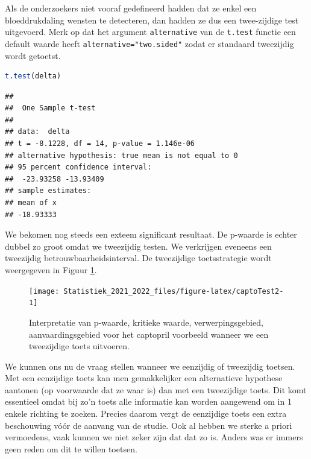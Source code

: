 \documentclass[
  12pt,dutch,coursenotes]{book}
\newcommand{\passthrough}[1]{#1}
\theoremstyle{definition}
\theoremstyle{definition}
\theoremstyle{definition}
\theoremstyle{definition}
\theoremstyle{remark}
\begin{document}
Als de onderzoekers niet vooraf gedefineerd hadden dat ze enkel een bloeddrukdaling wensten te detecteren, dan hadden ze dus een twee-zijdige test uitgevoerd.
Merk op dat het argument \passthrough{\lstinline!alternative!} van de \passthrough{\lstinline!t.test!} functie een default waarde heeft \passthrough{\lstinline!alternative="two.sided"!} zodat er standaard tweezijdig wordt getoetst.

\begin{lstlisting}[language=R]
t.test(delta)
\end{lstlisting}

\begin{lstlisting}
## 
##  One Sample t-test
## 
## data:  delta
## t = -8.1228, df = 14, p-value = 1.146e-06
## alternative hypothesis: true mean is not equal to 0
## 95 percent confidence interval:
##  -23.93258 -13.93409
## sample estimates:
## mean of x 
## -18.93333
\end{lstlisting}

We bekomen nog steeds een exteem significant resultaat. De p-waarde is echter dubbel zo groot omdat we tweezijdig testen.
We verkrijgen eveneens een tweezijdig betrouwbaarheidsinterval.
De tweezijdige toetsstrategie wordt weergegeven in Figuur \ref{fig:captoTest2}.

\begin{figure}

{\centering \texttt{[image: Statistiek\_2021\_2022\_files/figure-latex/captoTest2-1]} 

}

\caption{Interpretatie van p-waarde, kritieke waarde, verwerpingsgebied, aanvaardingsgebied voor het captopril voorbeeld wanneer we een tweezijdige toets uitvoeren.}\label{fig:captoTest2}
\end{figure}

We kunnen ons nu de vraag stellen wanneer we eenzijdig of tweezijdig toetsen.
Met een eenzijdige toets kan men gemakkelijker een alternatieve hypothese
aantonen (op voorwaarde dat ze waar is) dan met een tweezijdige toets. Dit
komt essentieel omdat bij zo'n toets alle informatie kan worden aangewend om
in 1 enkele richting te zoeken. Precies daarom vergt de eenzijdige toets een
extra beschouwing vóór de aanvang van de studie. Ook al hebben we sterke
a priori vermoedens, vaak kunnen we niet zeker zijn dat dat zo is.
Anders was er immers geen reden om
dit te willen toetsen.
\end{document}
